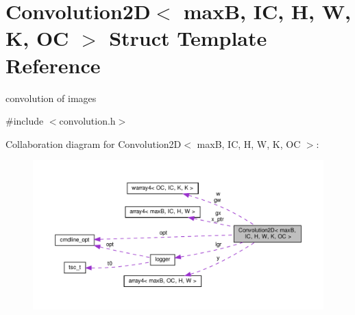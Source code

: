 \hypertarget{structConvolution2D}{}\section{Convolution2D$<$ maxB, IC, H, W, K, OC $>$ Struct Template Reference}
\label{structConvolution2D}


convolution of images  




{\ttfamily \#include $<$convolution.\+h$>$}



Collaboration diagram for Convolution2D$<$ maxB, IC, H, W, K, OC $>$\+:\nopagebreak
\begin{figure}[H]
\begin{center}
\leavevmode
\includegraphics[width=350pt]{structConvolution2D__coll__graph}
\end{center}
\end{figure}
